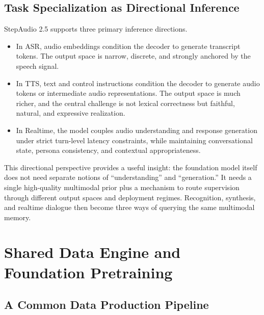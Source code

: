 \documentclass{llmxive}
\begin{document}
\subsection{Task Specialization as Directional Inference}

StepAudio 2.5 supports three primary inference directions.
\begin{itemize}
\item In ASR, audio embeddings condition the decoder to generate transcript tokens. The output space is narrow, discrete, and strongly anchored by the speech signal.
\item In TTS, text and control instructions condition the decoder to generate audio tokens or intermediate audio representations. The output space is much richer, and the central challenge is not lexical correctness but faithful, natural, and expressive realization.
\item In Realtime, the model couples audio understanding and response generation under strict turn-level latency constraints, while maintaining conversational state, persona consistency, and contextual appropriateness.
\end{itemize}

This directional perspective provides a useful insight: the foundation model itself does not need separate notions of ``understanding'' and ``generation.'' It needs a single high-quality multimodal prior plus a mechanism to route supervision through different output spaces and deployment regimes. Recognition, synthesis, and realtime dialogue then become three ways of querying the same multimodal memory.

\section{Shared Data Engine and Foundation Pretraining}
\label{sec:data}

\subsection{A Common Data Production Pipeline}
\end{document}
